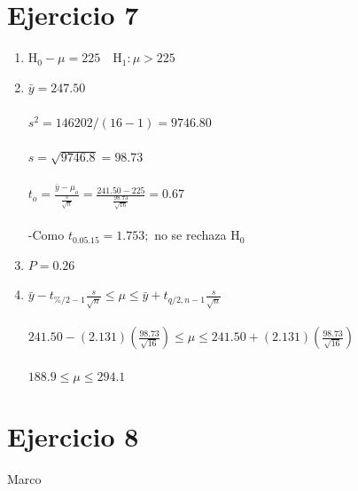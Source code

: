 \documentclass[12pt,a4paper,table]{article}
\begin{document}
\section*{Ejercicio 7}
\begin{enumerate}[label=(\alph*)]
    \item
    		$\mathrm{H}_{0}-\mu=225 \quad \mathrm{H}_{1}: \mu > 225$
    \item
    		$\bar{y}=247.50$\\\\
$s^{2}=146202 /(16-1)=9746.80$\\\\
$s=\sqrt{9746.8}=98.73$\\\\
$t_{o}=\frac{\bar{y}-\mu_{o}}{\frac{s}{\sqrt{n}}}=\frac{241.50-225}{\frac{98.73}{\sqrt{16}}}=0.67$\\\\
-Como $t_{0.05 .15}=1.753 ;$ no se rechaza $\mathrm{H}_{0}$
	\item
		$P=0.26$
	\item
		$\bar{y}-t_{\% / 2-1} \frac{s}{\sqrt{n}} \leq \mu \leq \bar{y}+t_{q / 2, n-1} \frac{s}{\sqrt{n}}$\\\\
$241.50-(2.131)\left(\frac{98.73}{\sqrt{16}}\right) \leq \mu \leq 241.50+(2.131)\left(\frac{98.73}{\sqrt{16}}\right)$\\\\
$188.9 \leq \mu \leq 294.1$
\end{enumerate}

\section*{Ejercicio 8}
Marco
\end{document}
